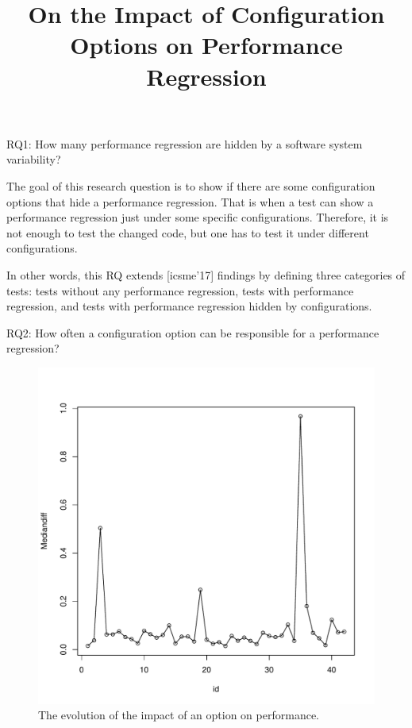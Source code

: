 \documentclass[smallextended]{svjour3}       %
\begin{document}
\title{On the Impact of Configuration Options on Performance Regression}

\newcommand{\RQI}{How many performance regression are hidden by a software system variability? }
\newcommand{\RQII}{How often a configuration option can be responsible for a performance regression?}
\newcommand{\RQIII}{After how long developers fix a configuration option performance regression? And how do they fix it?}

\author{\IEEEauthorblockN{}
\IEEEauthorblockA{}
}

\maketitle
\begin{abstract}



\end{abstract}

RQ1: \RQI


The goal of this research question is to show if there are some configuration options that hide a performance regression. That is when a test can show a performance regression just under some specific configurations. Therefore, it is not enough to test the changed code, but one has to test it under different configurations. 

In other words, this RQ extends [icsme'17] findings by defining three categories of tests: tests without any performance regression, tests with performance regression, and tests with performance regression hidden by configurations. 

RQ2: \RQII


\begin{figure}
    \centering
    \includegraphics[scale=0.5]{Figures/evolution.pdf}
    \caption{The evolution of the impact of an option on performance.}
    \label{fig:evolution}
\end{figure}
\end{document}
